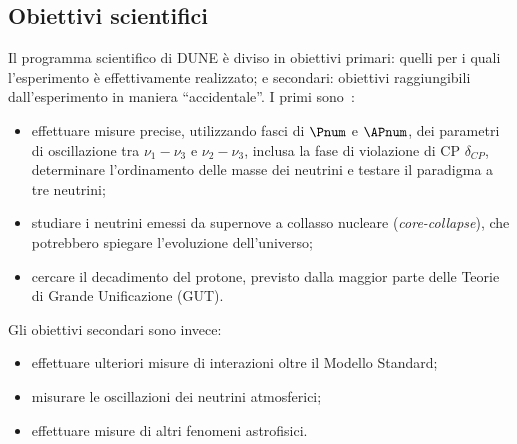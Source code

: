 \documentclass[../../main.tex]{subfiles}
\begin{document}
\subsection{Obiettivi scientifici} \label{subsec:obiettivi-scientifici}
  Il programma scientifico di DUNE è diviso in obiettivi primari: quelli per
  i quali l'esperimento è effettivamente realizzato; e secondari: obiettivi
  raggiungibili dall'esperimento in maniera ``accidentale''.
  I primi sono~\cite{dunecollaboration2022snowmassneutrinofrontierdune}:
  \begin{itemize}
    \item effettuare misure precise, utilizzando fasci di $\Pnum$ e $\APnum$,
    dei parametri di oscillazione tra $\nu_1 - \nu_3$ e $\nu_2 - \nu_3$, inclusa
    la fase di violazione di CP $\delta_{CP}$, determinare l'ordinamento delle
    masse dei neutrini e testare il paradigma a tre neutrini;

    \item studiare i neutrini emessi da supernove a collasso nucleare
    (\textit{core-collapse}), che potrebbero spiegare l'evoluzione
    dell'universo;

    \item cercare il decadimento del protone, previsto dalla
    maggior parte delle Teorie di Grande Unificazione (GUT).
  \end{itemize}
  Gli obiettivi secondari sono invece:
  \begin{itemize}
    \item effettuare ulteriori misure di interazioni oltre il Modello Standard;

    \item misurare le oscillazioni dei neutrini atmosferici;

    \item effettuare misure di altri fenomeni astrofisici.
  \end{itemize}
\end{document}

